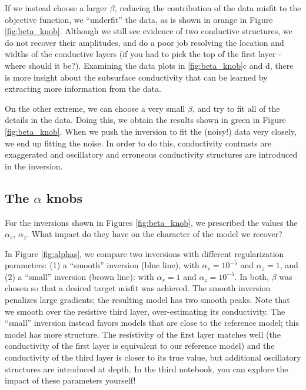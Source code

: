 \documentclass[11pt,oneside]{article}
\begin{document}
If we instead choose a larger $\beta$, reducing the contribution of the data misfit to the objective function, we ``underfit'' the data, as is shown in orange in Figure \ref{fig:beta_knob}. Although we still see evidence of two conductive structures, we do not recover their amplitudes, and do a poor job resolving the location and widths of the conductive layers (if you had to pick the top of the first layer - where should it be?). Examining the data plots in \ref{fig:beta_knob}c and d, there is more insight about the subsurface conductivity that can be learned by extracting more information from the data.

On the other extreme, we can choose a very small $\beta$, and try to fit all of the details in the data. Doing this, we obtain the results shown in green in Figure \ref{fig:beta_knob}. When we push the inversion to fit the (noisy!) data very closely, we end up fitting the noise. In order to do this, conductivity contrasts are exaggerated and oscillatory and erroneous conductivity structures are introduced in the inversion.



\subsection{The $\alpha$ knobs}

For the inversions shown in Figures \ref{fig:beta_knob}, we prescribed the values the $\alpha_s$, $\alpha_z$. What impact do they have on the character of the model we recover?

In Figure \ref{fig:alphas}, we compare two inversions with different regularization parameters: (1) a ``smooth'' inversion (blue line), with $\alpha_s = 10^{-5}$ and $\alpha_z = 1$, and (2) a ``small'' inversion (brown line): with $\alpha_s = 1$ and $\alpha_z = 10^{-5}$. In both, $\beta$ was chosen so that a desired target misfit was achieved. The smooth inversion penalizes large gradients; the resulting model has two smooth peaks. Note that we smooth over the resistive third layer, over-estimating its conductivity. The ``small'' inversion instead favors models that are close to the reference model; this model has more structure. The resistivity of the first layer matches well (the conductivity of the first layer is equivalent to our reference model) and the conductivity of the third layer is closer to its true value, but additional oscillatory structures are introduced at depth. In the third notebook, you can explore the impact of these parameters yourself!
\end{document}

